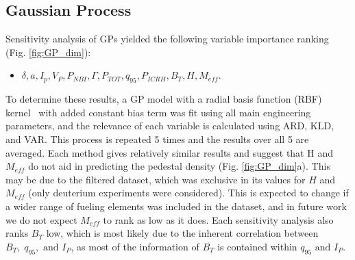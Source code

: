 \documentclass[a4paper, twoside, final, 12pt]{article}
\begin{document}
{\subsection{Gaussian Process}

Sensitivity analysis of GPs yielded the following variable importance ranking (Fig. \ref{fig:GP_dim}): 
\begin{itemize}
	\item  $\delta, a, I_p, V_P, P_{NBI},\Gamma, P_{TOT},  q_{95},  P_{ICRH}, B_T, H, M_{eff}$. 
\end{itemize}
To determine these results, a GP model with a radial basis function (RBF) kernel~\cite{kernel_cookbook} with added constant bias term was fit using all main engineering parameters, and the relevance of each variable is calculated using ARD, KLD, and VAR. This process is repeated 5 times and the results over all 5 are averaged. Each method gives relatively similar results and suggest that H and $M_{eff}$ do not aid in predicting the pedestal density (Fig. \ref{fig:GP_dim}a). This may be due to the filtered dataset, which was exclusive in its values for $H$ and $M_{eff}$ (only deuterium experiments were considered). This is expected to change if a wider range of fueling elements was included in the dataset, and in future work we do not expect $M_{eff}$ to rank as low as it does. Each sensitivity analysis also ranks $B_T$ low, which is most likely due to the inherent correlation between $B_T, \; q_{95}, \text{ and } I_P$, as most of the information of $B_T$ is contained within $q_{95} \text{ and } I_P$. 

}
\end{document}
